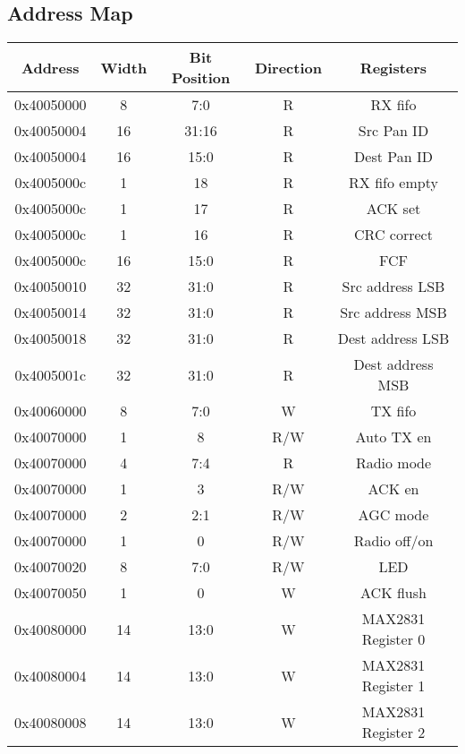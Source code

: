 \subsection{Address Map}
\begin{table*}[h]
\centering
\begin{threeparttable}
	\begin{tabular}{|c|c|c|c|c|}
		\hline
		{\bf Address} & {\bf Width} & {\bf Bit Position} & {\bf Direction} & {\bf Registers} \\ \hline
		0x40050000 & 8  & 7:0 	& R		& RX fifo\\ \hline
		0x40050004 & 16 & 31:16 & R		& Src Pan ID\tnote{a}\\
		0x40050004 & 16 & 15:0	& R		& Dest Pan ID\tnote{a}\\ \hline
		0x4005000c & 1	& 18	& R		& RX fifo empty\\
		0x4005000c & 1	& 17	& R		& ACK set\tnote{a}\\
		0x4005000c & 1	& 16	& R		& CRC correct\tnote{a}\\
		0x4005000c & 16 & 15:0	& R		& FCF\tnote{a}\\ \hline
		0x40050010 & 32 & 31:0	& R		& Src address LSB\tnote{a}\\ \hline
		0x40050014 & 32 & 31:0	& R		& Src address MSB\tnote{a}\\ \hline
		0x40050018 & 32 & 31:0	& R		& Dest address LSB\tnote{a}\\ \hline
		0x4005001c & 32 & 31:0	& R		& Dest address MSB\tnote{a}\\ \hline\hline
		0x40060000 & 8	& 7:0	& W		& TX fifo\\ \hline\hline
		0x40070000 & 1	& 8		& R/W	& Auto TX en\\
		0x40070000 & 4	& 7:4	& R		& Radio mode\\
		0x40070000 & 1	& 3		& R/W	& ACK en\\
		0x40070000 & 2	& 2:1	& R/W	& AGC mode\\
		0x40070000 & 1	& 0		& R/W	& Radio off/on\\ \hline
		0x40070020 & 8	& 7:0	& R/W	& LED\\ \hline
		0x40070050 & 1	& 0		& W		& ACK flush\\ \hline\hline
		0x40080000 & 14	& 13:0	& W		& MAX2831 Register 0\tnote{b}\\ \hline
		0x40080004 & 14	& 13:0	& W		& MAX2831 Register 1\tnote{b}\\ \hline
		0x40080008 & 14	& 13:0	& W		& MAX2831 Register 2\tnote{b}\\ \hline

\end{tabular}
\end{threeparttable}
\end{table*}
